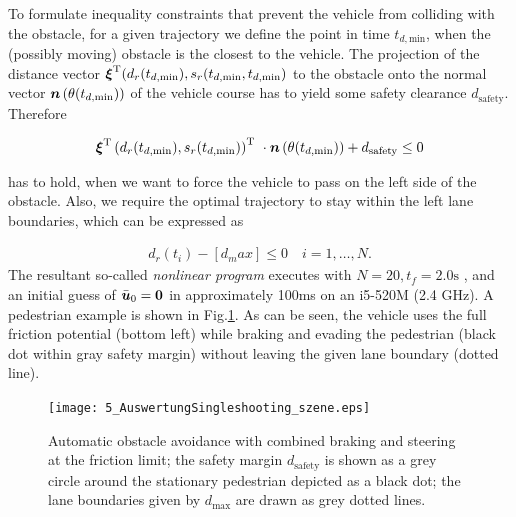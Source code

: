 To formulate inequality constraints that prevent the vehicle from colliding with the obstacle, for a given trajectory we define the point in time $t_{d,\mathrm{min}}$, when the (possibly moving) obstacle is the closest to the vehicle. 
The projection of the distance vector $\boldsymbol{\xi}^{{\rm T}}(d_r(t_{d,\mathrm{min}}),s_r(t_{d,\mathrm{min}},t_{d,\mathrm{min}})$ to the obstacle onto the normal vector $\boldsymbol{n}\left(\theta(t_{d,\mathrm{min}})\right)$ of the vehicle course has to yield some safety clearance $d_\mathrm{safety}$. Therefore

\begin{align*}
\boldsymbol{\xi}^{{\rm T}}\left(d_r(t_{d,\mathrm{min}}),s_r(t_{d,\mathrm{min}})\right)^{{\rm T}} \ \cdot \boldsymbol{n}\left(\theta(t_{d,\mathrm{min}})\right) +d_\mathrm{safety} \leq 0
\end{align*}

has to hold, when we want to force the vehicle to pass on the left side of the obstacle. 
Also, we require the optimal trajectory to stay within the left lane boundaries, which can be expressed as

\begin{align*}
d_r(t_i) - \left[ d_max \right] \leq 0 \quad i=1,\dots,N.
\end{align*}
The resultant so-called \emph{nonlinear program} executes with $N=20, t_f=2.0\mathrm{s}$ , and an initial guess of $\bar{\boldsymbol{u}}_0=\boldsymbol{0}$ in approximately 100ms  on an i5-520M (2.4 GHz). A pedestrian example is shown in Fig.\ref{fig:fussgaenger_draufsicht}. As can be seen, the vehicle uses the full friction potential (bottom left) while braking and evading the pedestrian (black dot within gray safety margin) without leaving the given lane boundary (dotted line).
\begin{figure}[h]
	\centering
	
	\renewcommand{\matlabtextA}{\scriptsize}
	\texttt{[image: 5\_AuswertungSingleshooting\_szene.eps]}		
    \caption[Combined braking and steering]{Automatic obstacle avoidance with combined braking and steering at the friction limit; the safety margin $d_\mathrm{safety}$  is shown as a grey circle around the stationary pedestrian depicted as a black dot; the lane boundaries given by $d_\mathrm{max}$  are drawn as grey dotted lines.}
    \label{fig:fussgaenger_draufsicht}
\end{figure}


